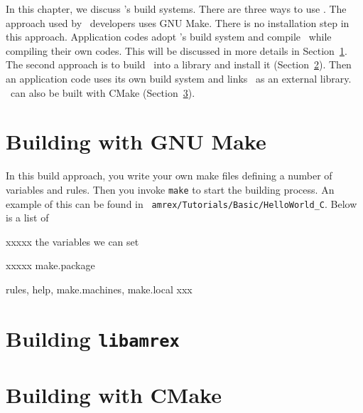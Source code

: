 
In this chapter, we discuss \amrex's build systems.  There are three
ways to use \amrex.  The approach used by \amrex\ developers uses GNU
Make.  There is no installation step in this approach.  Application
codes adopt \amrex's build system and compile \amrex\ while compiling
their own codes.  This will be discussed in more details in
Section~\ref{build:make}.  The second approach is to build \amrex\
into a library and install it (Section~\ref{build:lib}).  Then an
application code uses its own build system and links \amrex\ as an
external library.  \amrex\ can also be built with CMake
(Section~\ref{build:cmake}).

\section{Building with GNU Make}
\label{build:make}

In this build approach, you write your own make files defining a
number of variables and rules.  Then you invoke {\tt make} to start
the building process.  An example of this can be found in {\tt
  amrex/Tutorials/Basic/HelloWorld\_C}.  Below is a list of

xxxxx the variables we can set

xxxxx make.package

rules, help, make.machines, make.local xxx 

\section{Building {\tt libamrex}}
\label{build:lib}

\section{Building with CMake}
\label{build:cmake}


